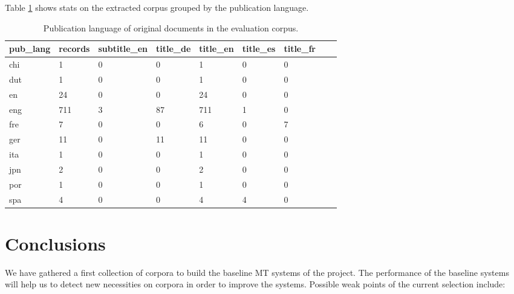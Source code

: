 \documentclass[a4paper,11pt]{article}
\begin{document}
Table \ref{tab:publang} shows stats on the extracted corpus grouped by the publication language. 

\begin{small}
\begin{table}[]
\centering
\begin{tabular}{lllllllll}
\toprule
pub\_lang  & records  & subtitle\_en & title\_de & title\_en & title\_es & title\_fr &  \\
\midrule
chi                  & 1            & 0            & 0         & 1         & 0         & 0         &  \\
dut                   & 1            & 0            & 0         & 1         & 0         & 0         &  \\
en                   & 24           & 0            & 0         & 24        & 0         & 0         &  \\
eng               & 711          & 3            & 87        & 711       & 1         & 0         &  \\
fre                  & 7            & 0            & 0         & 6         & 0         & 7         &  \\
ger                  & 11           & 0            & 11        & 11        & 0         & 0         &  \\
ita                  & 1            & 0            & 0         & 1         & 0         & 0         &  \\
jpn                & 2            & 0            & 0         & 2         & 0         & 0         &  \\
por           & 1            & 0            & 0         & 1         & 0         & 0         &  \\
spa          & 4            & 0            & 0         & 4         & 4         & 0         &  \\
\bottomrule
\end{tabular}
\caption{Publication language of original documents in the evaluation corpus.}
\label{tab:publang}
\end{table}
\end{small}




\section{Conclusions}
\label{s:conclusions}

We have gathered a first collection of corpora to build the baseline MT systems of the project. The performance of the baseline systems will help us to detect new necessities on corpora in order to improve the systems. Possible weak points of the current selection include:
\end{document}
